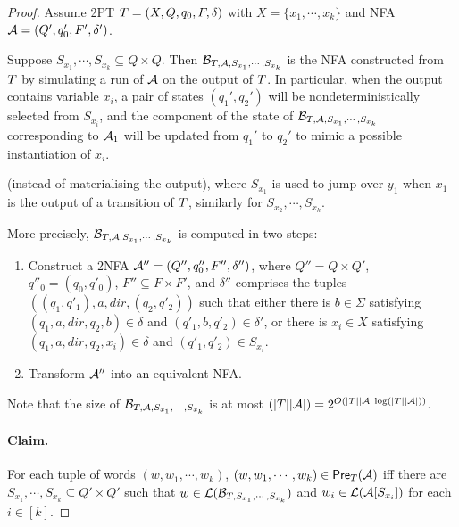 \begin{proof}
Assume 2PT $T=(X, Q, q_0, F, \delta)$ with $X = \{x_1,\cdots, x_k\}$ and NFA $\mathcal{A}=(Q', q'_0, F', \delta')$. %

Suppose $S_{x_1}, \cdots, S_{x_k} \subseteq Q \times Q$. 
%
 Then $\mathcal{B}_{T, \mathcal{A}, S_{x_1}, \cdots, S_{x_k}}$ is the NFA constructed from $T$  by simulating a run of $\mathcal{A}$ on the output of $T$. In particular, when the output contains variable $x_i$, a pair of states $(q_1', q_2')$ will be nondeterministically selected from $S_{x_i}$, and the component of the state of $\mathcal{B}_{T, \mathcal{A}, S_{x_1}, \cdots, S_{x_k}}$ corresponding to $\mathcal{A}_1$ will be updated from $q_1'$ to $q_2'$ to mimic a possible instantiation of $x_i$.  

(instead of materialising the output), where $S_{x_1}$ is used to jump over $y_1$ when $x_1$ is the output of a transition of $T$, similarly for $S_{x_2}, \cdots, S_{x_k}$. 


More precisely, $\mathcal{B}_{T, \mathcal{A}, S_{x_1}, \cdots, S_{x_k}}$ is computed in two steps:
\begin{enumerate} 
\item Construct a 2NFA $\mathcal{A}'' = (Q'', q''_{0}, F'', \delta'')$, where $Q'' = Q \times Q'$, $q''_0 = (q_0, q'_0)$, $F'' \subseteq F \times F'$, and $\delta''$ comprises the tuples $((q_1, q'_1), a, dir, (q_2, q'_2))$ such that either there is $b \in \Sigma$ satisfying $(q_1, a, dir, q_2, b) \in \delta$ and $(q'_1, b, q'_2) \in \delta'$, or there is $x_i \in X$ satisfying $(q_1, a, dir, q_2, x_i) \in \delta$  and $(q'_1, q'_2) \in S_{x_i}$.
\item Transform $\mathcal{A}''$ into an equivalent NFA.
\end{enumerate} 
Note that the size of $\mathcal{B}_{T, \mathcal{A}, S_{x_1}, \cdots, S_{x_k}}$ is at most $(|T||\mathcal{A}|)=2^{O(|T||\mathcal{A}| \log(|T||\mathcal{A}|))}$. 

\paragraph{Claim.} For each tuple of words $(w, w_1,\cdots, w_k)$, $(w, w_1,\cdots, w_k) \in \textsf{Pre}_{T}(\mathcal{A})$ iff there are $S_{x_1}, \cdots, S_{x_k} \subseteq Q' \times Q'$ such that $w \in \mathcal{L}(\mathcal{B}_{T, S_{x_1}, \cdots, S_{x_k}})$ and $w_i \in \mathcal{L}(\mathcal{A}[S_{x_i}])$ for each $i \in [k]$.


\end{proof}

